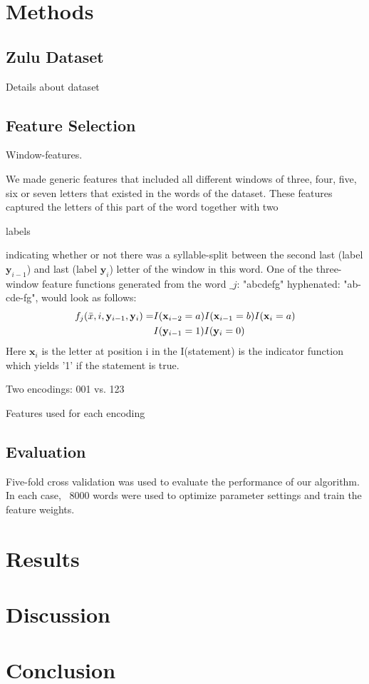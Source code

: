 \documentclass[10pt,twocolumn,letterpaper]{article}
\newcommand{\x}{\mathbf{x}}
\newcommand{\y}{\mathbf{y}}
\begin{document}
\section{Methods}
\subsection{Zulu Dataset}
Details about dataset

\subsection{Feature Selection}
\begin{em}Window-features.\end{em} We made generic features that included all different windows of three, four, five, six or seven letters that existed in the words of the dataset. These features captured the letters of this part of the word together with two \begin{em}labels\end{em} indicating whether or not there was a syllable-split between the second last (label $\y_{i-1}$) and last (label $\y_i$) letter of the window in this word. One of the three-window feature functions generated from the word $\_j$: "abcdefg" hyphenated: "ab-cde-fg", would look as follows:
\begin{align}
f_j(\bar{x},i,\y_{i-1},\y_i) =&I(\x_{i-2}=a)I(\x_{i-1}=b)I(\x_i=a)\notag\\
&I(\y_{i-1}=1)I(\y_i=0)
\end{align}
Here $\x_i$ is the letter at position i in the I(statement) is the indicator function which yields '1' if the statement is true.

Two encodings: 001 vs. 123

Features used for each encoding

\subsection{Evaluation}
Five-fold cross validation was used to evaluate the performance of our algorithm.  In each case, ~8000 words were used to optimize parameter settings and train the feature weights. 



\section{Results}
\section{Discussion}
\section{Conclusion}



{\small


}
\end{document}
